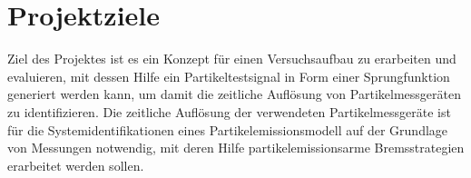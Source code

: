 \section{Projektziele}
Ziel des Projektes ist es ein Konzept f\"{u}r einen Versuchsaufbau zu erarbeiten und evaluieren, mit dessen Hilfe ein Partikeltestsignal in Form einer Sprungfunktion generiert werden kann, um damit die zeitliche Aufl\"{o}sung von Partikelmessger\"{a}ten zu identifizieren. Die zeitliche Aufl\"{o}sung der verwendeten Partikelmessger\"{a}te ist f\"{u}r die Systemidentifikationen eines Partikelemissionsmodell auf der Grundlage von Messungen notwendig, mit deren Hilfe partikelemissionsarme Bremsstrategien erarbeitet werden sollen.  